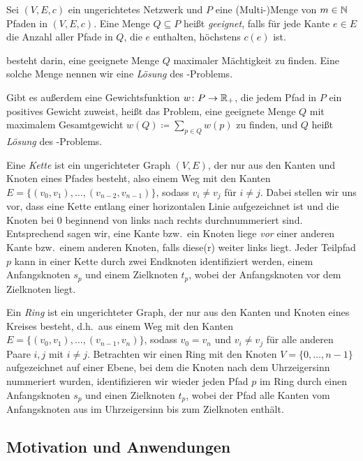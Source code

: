 \begin{definition}
    Sei $(V,E,c)$ ein ungerichtetes Netzwerk und $P$ eine (Multi-)Menge von $m \in \mathbb N$ Pfaden in $(V,E,c)$.
    Eine Menge $Q \subseteq P$ heißt {\em geeignet}, falls für jede Kante $e \in E$ die Anzahl aller Pfade in $Q$,
    die $e$ enthalten, höchstens $c(e)$ ist.
    
    {\em \CallControl} besteht darin, eine geeignete Menge $Q$ maximaler Mächtigkeit zu finden.
    Eine solche Menge nennen wir eine {\em Lösung} des \CallControl-Problems.
    
    Gibt es außerdem eine Gewichtsfunktion $w \colon P \rightarrow \mathbb R_+$, die jedem Pfad in $P$ ein 
    positives Gewicht zuweist, heißt das Problem, eine geeignete Menge $Q$ mit maximalem Gesamtgewicht
    $w(Q) \coloneqq \sum_{p \in Q} w(p)$ zu finden, {\em \WeightedCallControl} und $Q$ heißt 
    {\em Lösung} des \WeightedCallControl-Problems.
\end{definition}

Eine {\em Kette} ist ein ungerichteter Graph $(V,E)$, der nur aus den Kanten und Knoten eines Pfades besteht, also einem
Weg mit den Kanten $E=\{(v_0, v_1),\dots,(v_{n-2},v_{n-1})\}$, sodass $v_i \neq v_j$ für $i \neq j$.
Dabei stellen wir uns vor, dass eine Kette entlang einer horizontalen Linie aufgezeichnet ist und die
Knoten bei $0$ beginnend von links nach rechts durchnummeriert sind. 
Entsprechend sagen wir, eine Kante bzw.\ ein Knoten liege {\em vor} einer anderen Kante bzw.\ einem anderen Knoten, 
falls diese(r) weiter links liegt.
Jeder Teilpfad $p$ kann in einer Kette durch zwei Endknoten identifiziert werden, einem Anfangsknoten $s_p$ und einem 
Zielknoten $t_p$, wobei der Anfangsknoten vor dem Zielknoten liegt.

Ein {\em Ring} ist ein ungerichteter Graph, der nur aus den Kanten und Knoten eines Kreises besteht, d.h.\ aus einem Weg 
mit den Kanten $E=\{(v_0, v_1),\dots,(v_{n-1},v_{n})\}$, sodass $v_0 = v_n$ und $v_i \neq v_j$ für alle anderen Paare $i,j$ 
mit $i \neq j$.
Betrachten wir einen Ring mit den Knoten $V=\{0, \dots , n-1\}$ aufgezeichnet auf einer Ebene, bei dem die Knoten nach
dem Uhrzeigersinn nummeriert wurden, identifizieren wir wieder jeden Pfad $p$ im Ring durch einen Anfangsknoten $s_p$ und einen Zielknoten 
$t_p$, wobei der Pfad alle Kanten vom Anfangsknoten aus im Uhrzeigersinn bis zum Zielknoten enthält.

\subsection{Motivation und Anwendungen}\label{subsec:motivationUndAnwendungen}

